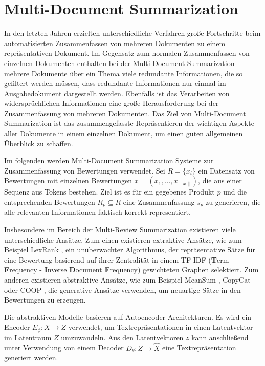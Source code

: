 \section{Multi-Document Summarization}
In den letzten Jahren erzielten unterschiedliche Verfahren große Fortschritte beim automatisierten Zusammenfassen von mehreren Dokumenten zu einem repräsentativen Dokument.
Im Gegensatz zum normalen Zusammenfassen von einzelnen Dokumenten enthalten bei der Multi-Document Summarization mehrere Dokumente über ein Thema viele redundante Informationen, die so gefiltert werden müssen, dass redundante Informationen nur einmal im Ausgabedokument dargestellt werden.
Ebenfalls ist das Verarbeiten von widersprüchlichen Informationen eine große Herausforderung bei der Zusammenfassung von mehreren Dokumenten.
Das Ziel von Multi-Document Summarization ist das zusammengefasste Repräsentieren der wichtigen Aspekte aller Dokumente in einem einzelnen Dokument, um einen guten allgemeinen Überblick zu schaffen.

Im folgenden werden Multi-Document Summarization Systeme zur Zusammenfassung von Bewertungen verwendet.
Sei $R= \{x_i \}$ ein Datensatz von Bewertungen mit einzelnen Bewertungen $x=(x_1,...,x_{\| x \|})$, die aus einer Sequenz aus Tokens bestehen.
Ziel ist es für ein gegebenes Produkt $p$ und die entsprechenden Bewertungen $R_p \subseteq R$ eine Zusammenfassung $s_p$ zu generieren, die alle relevanten Informationen faktisch korrekt representiert.


Insbesondere im Bereich der Multi-Review Summarization existieren viele unterschiedliche Ansätze.
Zum einen existieren extraktive Ansätze, wie zum Beispiel LexRank \citep{lexrank}, ein unüberwachter Algorithmus, der repräsentative Sätze für eine Bewertung basierend auf ihrer Zentralität in einem TF-IDF (\textbf{T}erm \textbf{F}requency - \textbf{I}nverse \textbf{D}ocument \textbf{F}requency) \citep{tfidf} gewichteten Graphen selektiert.
Zum anderen existieren abstraktive Ansätze, wie zum Beispiel MeanSum \citep{meansum}, CopyCat \citep{copycat} oder COOP \citep{coop}, die generative Ansätze verwenden, um neuartige Sätze in den Bewertungen zu erzeugen.

Die abstraktiven Modelle basieren auf Autoencoder Architekturen. Es wird ein Encoder $E_\phi : X \rightarrow Z$ verwendet, um Textrepräsentationen in einen Latentvektor im Latentraum $Z$ umzuwandeln.
Aus den Latentvektoren $z$ kann anschließend unter Verwendung von einem Decoder $D_\theta : Z \rightarrow \hat{X}$ eine Textrepräsentation generiert werden.


